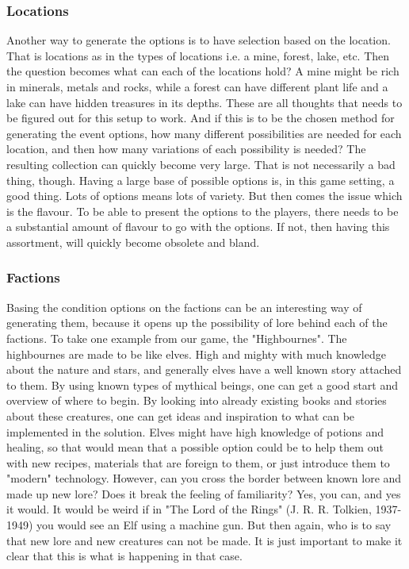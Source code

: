 \subsubsection{Locations}
Another way to generate the options is to have selection based on the location. That is locations as in the types of locations i.e. a mine, forest, lake, etc. Then the question becomes what can each of the locations hold? A mine might be rich in minerals, metals and rocks, while a forest can have different plant life and a lake can have hidden treasures in its depths. These are all thoughts that needs to be figured out for this setup to work. And if this is to be the chosen method for generating the event options, how many different possibilities are needed for each location, and then how many variations of each possibility is needed? The resulting collection can quickly become very large. 
That is not necessarily a bad thing, though. Having a large base of possible options is, in this game setting, a good thing. Lots of options means lots of variety. But then comes the issue which is the flavour. To be able to present the options to the players, there needs to be a substantial amount of flavour to go with the options. If not, then having this assortment, will quickly become obsolete and bland.

\subsubsection{Factions}
Basing the condition options on the factions can be an interesting way of generating them, because it opens up the possibility of lore behind each of the factions. To take one example from our game, the "Highbournes". The highbournes are made to be like elves. High and mighty with much knowledge about the nature and stars, and generally elves have a well known story attached to them. By using known types of mythical beings, one can get a good start and overview of where to begin. By looking into already existing books and stories about these creatures, one can get ideas and inspiration to what can be implemented in the solution. Elves might have high knowledge of potions and healing, so that would mean that a possible option could be to help them out with new recipes, materials that are foreign to them, or just introduce them to "modern" technology.
However, can you cross the border between known lore and made up new lore? Does it break the feeling of familiarity?
Yes, you can, and yes it would. It would be weird if in "The Lord of the Rings" (J. R. R. Tolkien, 1937-1949) you would see an Elf using a machine gun.
But then again, who is to say that new lore and new creatures can not be made. It is just important to make it clear that this is what is happening in that case.

